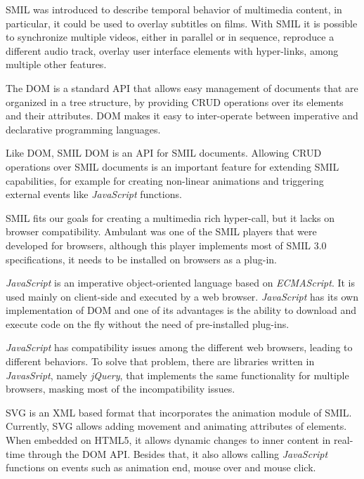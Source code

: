 \documentclass[conference,compsoc,a4paper]{IEEEtran}
\begin{document}
  

  \gls{SMIL}\cite{smil} was introduced to describe temporal behavior of multimedia content, in particular, it could be used to overlay subtitles on films. With \gls{SMIL} it is possible to synchronize multiple videos, either in parallel or in sequence, reproduce a different audio track, overlay user interface elements with hyper-links, among multiple other features.
  

The \gls{DOM} is a standard \gls{API} that allows easy management of documents that are organized in a tree structure, by providing \gls{CRUD} operations over its elements and their attributes. \gls{DOM} makes it easy to inter-operate between imperative and declarative programming languages\cite{dom}.

Like \gls{DOM}, \gls{SMIL} \gls{DOM} is an \gls{API} for \gls{SMIL} documents. Allowing \gls{CRUD} operations over \gls{SMIL} documents is an important feature for extending \gls{SMIL} capabilities, for example for creating non-linear animations and triggering external events like \emph{JavaScript} functions.  

  
  
  \gls{SMIL} fits our goals for creating a multimedia rich hyper-call, but it lacks on browser compatibility. Ambulant \cite{ambulant} was one of the SMIL players that were developed for browsers, although this player implements most of \gls{SMIL} 3.0 \cite{smil3} specifications, it needs to be installed on browsers as a plug-in.


  \emph{JavaScript} is an imperative object-oriented language based on \emph{ECMAScript}. It is used mainly on client-side and executed by a web browser. \emph{JavaScript} has its own implementation of \gls{DOM} and one of its advantages is the ability to download and execute code on the fly without the need of pre-installed plug-ins.

  \emph{JavaScript} has compatibility issues among the different web browsers, leading to different behaviors. To solve that problem, there are libraries written in \emph{JavasSript}, namely \emph{jQuery}, that implements the same functionality for multiple browsers, masking most of the incompatibility issues.

  \gls{SVG} is an \gls{XML} based format that incorporates the animation module of \gls{SMIL}. Currently, \gls{SVG} allows adding movement and animating attributes of elements. When embedded on \gls{HTML}5, it allows dynamic changes to inner content in real-time through the \gls{DOM} \gls{API}. Besides that, it also allows calling \emph{JavaScript} functions on events such as animation end, mouse over and mouse click.
  
\end{document}
